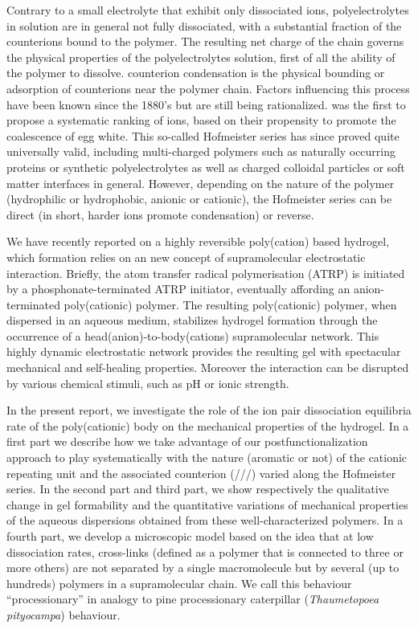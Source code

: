 \documentclass[journal=jacsat,manuscript=article]{achemso}
\begin{document}
Contrary to a small electrolyte that exhibit only dissociated ions, polyelectrolytes in solution are in general not fully dissociated, with a substantial fraction of the counterions bound to the polymer\cite{Manning1979}. The resulting net charge of the chain governs the physical properties of the polyelectrolytes solution\cite{Rubinstein1996}, first of all the ability of the polymer to dissolve. counterion condensation is the physical bounding or adsorption of counterions near the polymer chain. Factors influencing this process have been known since the 1880's but are still being rationalized. \citet{Hofmeister1888} was the first to propose a systematic ranking of ions, based on their propensity to promote the coalescence of egg white. This so-called Hofmeister series has since proved quite universally valid\cite{Zhang2010a}, including multi-charged polymers such as naturally occurring proteins or synthetic polyelectrolytes as well as charged colloidal particles\cite{Schwierz2010,Oncsik2015} or soft matter interfaces in general\cite{Leontidis2014}. However, depending on the nature of the polymer (hydrophilic or hydrophobic, anionic or cationic), the Hofmeister series can be direct (in short, harder ions promote condensation) or reverse\cite{Schwierz2010,Oncsik2015}.

We have recently reported on a highly reversible poly(cation) based hydrogel\cite{Srour2014}, which formation relies on an new concept of supramolecular  electrostatic interaction. Briefly, the atom transfer radical polymerisation (ATRP) is initiated by a phosphonate-terminated ATRP initiator, eventually affording an anion-terminated poly(cationic) polymer. The resulting poly(cationic) polymer, when dispersed in an aqueous medium, stabilizes hydrogel formation through the occurrence of a head(anion)-to-body(cations) supramolecular network. This highly dynamic electrostatic network provides the resulting gel with spectacular mechanical and self-healing properties. Moreover the interaction can be disrupted by various chemical stimuli, such as pH or ionic strength.

In the present report, we investigate the role of the ion pair dissociation equilibria rate of the poly(cationic) body on the mechanical properties of the hydrogel. In a first part we describe how we take advantage of our postfunctionalization approach to play systematically with the nature (aromatic or not) of the cationic repeating unit and the associated counterion (///) varied along the Hofmeister series. In the second part and third part, we show respectively the qualitative change in gel formability and the quantitative variations of mechanical properties of the aqueous dispersions obtained from these well-characterized polymers. In a fourth part, we develop a microscopic model based on the idea that at low dissociation rates, cross-links (defined as a polymer that is connected to three or more others) are not separated by a single macromolecule but by several (up to hundreds) polymers in a supramolecular chain. We call this behaviour ``processionary'' in analogy to pine processionary caterpillar (\textit{Thaumetopoea pityocampa}) behaviour\cite{Fabre1916}.%
\end{document}
